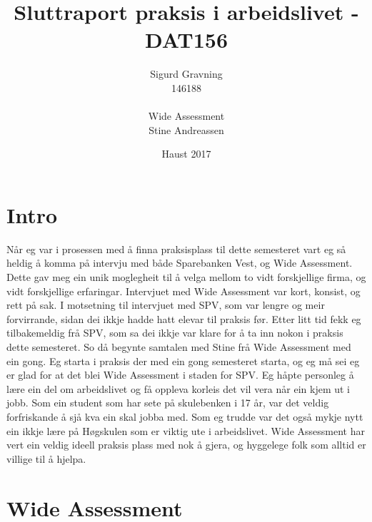 \documentclass[12pt]{article}
\title{Sluttraport praksis i arbeidslivet - DAT156}
\date{Haust 2017}
\author{Sigurd Gravning \\146188 \\ \\Wide Assessment \\Stine Andreassen}
\begin{document}
\maketitle
{}
\newpage
{}
\tableofcontents
\newpage

\section{Intro}

Når eg var i prosessen med å finna praksisplass til dette semesteret vart eg så
heldig å komma på intervju med både Sparebanken Vest, og Wide Assessment.
Dette gav meg ein unik moglegheit til å velga mellom to vidt forskjellige firma,
og vidt forskjellige erfaringar. Intervjuet med Wide Assessment var kort, konsist,
og rett på sak. I motsetning til intervjuet med SPV, som var lengre og meir forvirrande,
sidan dei ikkje hadde hatt elevar til praksis før. Etter litt tid fekk eg
tilbakemeldig frå SPV, som sa dei ikkje var klare for å ta inn nokon i praksis
dette semesteret. So då begynte samtalen med Stine frå Wide Assessment med ein gong.
Eg starta  i praksis der med ein gong semesteret starta, og eg må sei eg er glad
for at det blei Wide Assessment i staden for SPV. Eg håpte personleg å lære ein
del om arbeidslivet og få oppleva korleis det vil vera når ein kjem ut i jobb.
Som ein student som har sete på skulebenken i 17 år, var det veldig forfriskande
å sjå kva ein skal jobba med. Som eg trudde var det også mykje nytt ein ikkje
lære på Høgskulen som er viktig ute i arbeidslivet. Wide Assessment har vert
ein veldig ideell praksis plass med nok å gjera, og hyggelege folk som alltid
er villige til å hjelpa.

\section{Wide Assessment}
\end{document}
